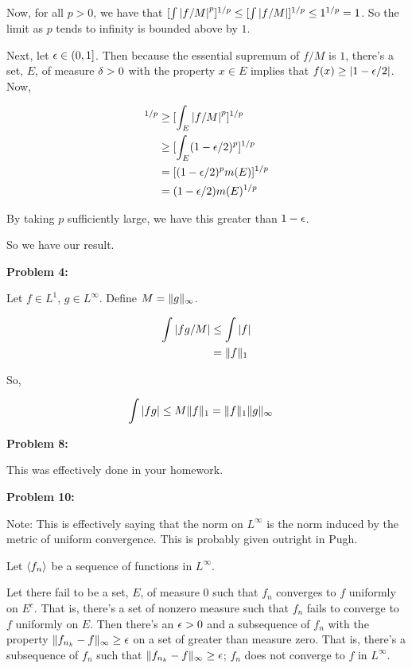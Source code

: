 \documentclass[a4paper,12pt]{article}
\begin{document}
Now, for all $p>0$, we have that $[\int \left\lvert f/M \right\rvert^p]^{1/p} \leq [\int \left\lvert f/M \right\rvert]^{1/p} \leq 1^{1/p} = 1$. So the limit as $p$ tends to infinity is bounded above by $1$. 

Next, let $\epsilon \in (0,1]$. Then because the essential supremum of $f/M$ is $1$, there's a set, $E$, of measure $\delta>0$ with the property $x \in E$ implies that $f(x) \geq \left\lvert 1-\epsilon/2 \right\rvert$. Now,

\begin{align*}
[\int \absval{f/M}^p]^{1/p} &\geq [\int_E \absval{f/M}^p]^{1/p}\\
&\geq [\int_E (1-\ep/2)^p]^{1/p}\\
&= [(1-\ep/2)^p m(E)]^{1/p}\\
&= (1-\ep/2)m(E)^{1/p}
\end{align*}

By taking $p$ sufficiently large, we have this greater than $1-\epsilon$. 

So we have our result.

\shunt

{\bf Problem 4:}

Let $f \in L^1$, $g \in L^\infty$. Define $M = \|g\|_\infty$.

\begin{align*}
\int\left\lvert fg/M \right\rvert  &\leq \int \left\lvert f \right\rvert\\
&= \|f\|_1
\end{align*}

So,

\begin{align*}
\int\left\lvert fg \right\rvert  &\leq M\|f\|_1 = \|f\|_1\|g\|_\infty
\end{align*}
\shunt

{\bf Problem 8:}

This was effectively done in your homework.

\shunt

{\bf Problem 10:}

Note: This is effectively saying that the norm on $L^\infty$ is the norm induced by the metric of uniform convergence. This is probably given outright in Pugh.

Let $\left\langle f_n \right\rangle$ be a sequence of functions in $L^\infty$.

Let there fail to be a set, $E$, of measure $0$ such that $f_n$ converges to $f$ uniformly on $E^c$. That is, there's a set of nonzero measure such that $f_n$ fails to converge to $f$ uniformly on $E$. Then there's an $\epsilon>0$ and a subsequence of $f_n$ with the property $\|f_{n_k} - f\|_\infty \geq \epsilon$ on a set of greater than measure zero. That is, there's a subsequence of $f_n$ such that $\|f_{n_k}-f\|_\infty \geq \epsilon$; $f_n$ does not converge to $f$ in $L^\infty$. 
\end{document}
